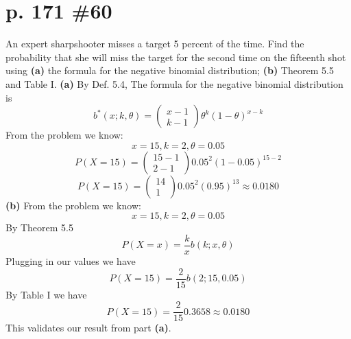 \documentclass[12pt]{article}
\begin{document}
	\section[20pt]{p. 171 \#60}
	An expert sharpshooter misses a target 5 percent of the time. Find the probability that she will miss the target for the second time on the fifteenth shot using \newline
	\textbf{(a)} the formula for the negative binomial distribution; \newline
	\textbf{(b)} Theorem 5.5 and Table I.
	\newline
	\newline
	\textbf{(a)} By Def. 5.4, The formula for the negative binomial distribution is \[b^*(x;k,\theta)=\left(\begin{array}{ccc}
	x-1\\ k-1
	\end{array}\right)\theta^k(1-\theta)^{x-k}\]
	From the problem we know:
	\[x=15,k=2,\theta=0.05\]
	\[P(X=15)=\left(\begin{array}{ccc}
	15-1\\ 2-1
	\end{array}\right)0.05^2(1-0.05)^{15-2}\]
	\[P(X=15)=\left(\begin{array}{ccc}
	14\\ 1
	\end{array}\right)0.05^2(0.95)^{13}\approx 0.0180\]
	\newline
	\newline
	\textbf{(b)} From the problem we know:
	\[x=15,k=2,\theta=0.05\]
	By Theorem 5.5
	\[P(X=x)=\frac{k}{x}b(k;x,\theta)\]
	Plugging in our values we have
	\[P(X=15)=\frac{2}{15}b(2;15,0.05)\]
	By Table I we have
	\[P(X=15)=\frac{2}{15}0.3658\approx 0.0180\]
	This validates our result from part \textbf{(a)}.
\end{document}

